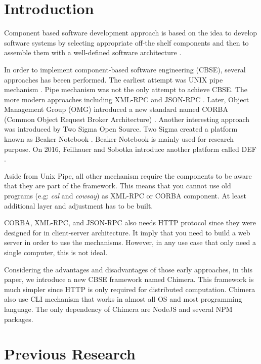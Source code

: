 \documentclass[conference]{IEEEtran}
\begin{document}
\IEEEpeerreviewmaketitle

\section{Introduction}

Component based software development approach is based on the idea to develop 
software systems by selecting appropriate off-the shelf components and then to 
assemble them with a well-defined software architecture \cite{kaur2010component}.

In order to implement component-based software engineering (CBSE), several 
approaches has beeen performed. The earliest attempt was UNIX pipe mechanism 
\cite{mcilroy1968mass}. Pipe mechanism was not the only attempt to achieve CBSE.
The more modern approaches including XML-RPC \cite{xmlrpc} and JSON-RPC \cite{jsonrpc}. 
Later, Object Management Group (OMG) introduced a new standard named CORBA (Common
Object Request Broker Architecture) \cite{corba}. Another interesting approach was 
introduced by Two Sigma Open Source. Two Sigma created a platform known as Beaker
Notebook \cite{beakernotebook}. Beaker Notebook is mainly used for research purpose. 
On 2016, Feilhauer and Sobotka introduce another platform called DEF 
\cite{feilhauer2016def}.

Aside from Unix Pipe, all other mechanism require the components to be aware that 
they are part of the framework. This means that you cannot use old programs (e.g:
{\it cal} and {\it cowsay}) as XML-RPC or CORBA component. At least additional layer
and adjustment has to be built.

CORBA, XML-RPC, and JSON-RPC also needs HTTP protocol since they were designed for 
in client-server architecture. It imply that you need to build a web server in order
to use the mechanisms. However, in any use case that only need a single computer,
this is not ideal.

Considering the advantages and disadvantages of those early approaches, in this paper, 
we introduce a new CBSE framework named Chimera. This framework is much simpler since
HTTP is only required for distributed computation. Chimera also use CLI mechanism that
works in almost all OS and most programming language.
The only dependency of Chimera are NodeJS and several NPM packages.

\section{Previous Research}
\end{document}
